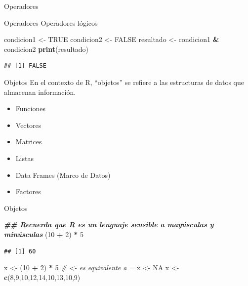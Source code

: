 \documentclass[
  ignorenonframetext,
]{beamer}
\newenvironment{Shaded}{\begin{snugshade}}{\end{snugshade}}
\newcommand{\CommentTok}[1]{\textcolor[rgb]{0.56,0.35,0.01}{\textit{#1}}}
\newcommand{\ConstantTok}[1]{\textcolor[rgb]{0.56,0.35,0.01}{#1}}
\newcommand{\DecValTok}[1]{\textcolor[rgb]{0.00,0.00,0.81}{#1}}
\newcommand{\DocumentationTok}[1]{\textcolor[rgb]{0.56,0.35,0.01}{\textbf{\textit{#1}}}}
\newcommand{\FunctionTok}[1]{\textcolor[rgb]{0.13,0.29,0.53}{\textbf{#1}}}
\newcommand{\NormalTok}[1]{#1}
\newcommand{\OtherTok}[1]{\textcolor[rgb]{0.56,0.35,0.01}{#1}}
\newcommand{\SpecialCharTok}[1]{\textcolor[rgb]{0.81,0.36,0.00}{\textbf{#1}}}
\providecommand{\tightlist}{%
  \setlength{\itemsep}{0pt}\setlength{\parskip}{0pt}}
\begin{document}
\begin{frame}[fragile]{Operadores}
\begin{block}{Operadores \textbar{} Operadores lógicos}
\begin{Shaded}
\begin{Highlighting}[]
\NormalTok{condicion1 }\OtherTok{\textless{}{-}} \ConstantTok{TRUE}
\NormalTok{condicion2 }\OtherTok{\textless{}{-}} \ConstantTok{FALSE}
\NormalTok{resultado }\OtherTok{\textless{}{-}}\NormalTok{ condicion1 }\SpecialCharTok{\&}\NormalTok{ condicion2}
\FunctionTok{print}\NormalTok{(resultado)}
\end{Highlighting}
\end{Shaded}

\begin{verbatim}
## [1] FALSE
\end{verbatim}
\end{block}
\end{frame}

\begin{frame}[fragile]{Objetos}
\protect\hypertarget{objetos}{}
En el contexto de R, ``objetos'' se refiere a las estructuras de datos
que almacenan información.

\begin{itemize}
\tightlist
\item
  Funciones
\item
  Vectores
\item
  Matrices
\item
  Listas
\item
  Data Frames (Marco de Datos)
\item
  Factores
\end{itemize}

\begin{block}{Objetos}
\protect\hypertarget{objetos-1}{}
\begin{Shaded}
\begin{Highlighting}[]
\DocumentationTok{\#\# Recuerda que R es un lenguaje sensible a mayúsculas y minúsculas}
\NormalTok{(}\DecValTok{10} \SpecialCharTok{+} \DecValTok{2}\NormalTok{) }\SpecialCharTok{*} \DecValTok{5}
\end{Highlighting}
\end{Shaded}

\begin{verbatim}
## [1] 60
\end{verbatim}

\begin{Shaded}
\begin{Highlighting}[]
\NormalTok{x }\OtherTok{\textless{}{-}}\NormalTok{ (}\DecValTok{10} \SpecialCharTok{+} \DecValTok{2}\NormalTok{) }\SpecialCharTok{*} \DecValTok{5}  \CommentTok{\# \textless{}{-} es equivalente a =}
\NormalTok{x }\OtherTok{\textless{}{-}} \ConstantTok{NA}
\NormalTok{x }\OtherTok{\textless{}{-}} \FunctionTok{c}\NormalTok{(}\DecValTok{8}\NormalTok{,}\DecValTok{9}\NormalTok{,}\DecValTok{10}\NormalTok{,}\DecValTok{12}\NormalTok{,}\DecValTok{14}\NormalTok{,}\DecValTok{10}\NormalTok{,}\DecValTok{13}\NormalTok{,}\DecValTok{10}\NormalTok{,}\DecValTok{9}\NormalTok{)}


\end{Highlighting}
\end{Shaded}
\end{block}
\end{frame}
\end{document}
